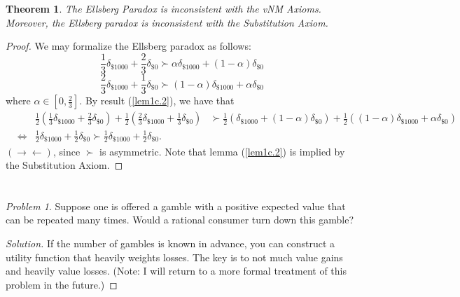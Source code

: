 \documentclass[12pt]{article}
\newtheorem{thm}{Theorem}[section]
\theoremstyle{definition}
\theoremstyle{remark}
\newtheorem{prob}{Problem}[section]
\def\contra{\rightarrow \leftarrow}
\begin{document}
\section{}
\begin{thm}
  The Ellsberg Paradox is inconsistent with the vNM Axioms. Moreover, the Ellsberg paradox is inconsistent with the Substitution Axiom.
\end{thm}
\begin{proof}
  We may formalize the Ellsberg paradox as follows:
  $$\frac{1}{3}\delta_{\$1000} + \frac{2}{3}\delta_{\$0} \succ \alpha \delta_{\$1000} + (1 - \alpha)\delta_{\$0}$$
  $$\frac{2}{3}\delta_{\$1000} + \frac{1}{3}\delta_{\$0} \succ (1 - \alpha) \delta_{\$1000} + \alpha\delta_{\$0}$$
  where $\alpha \in [0, \frac{2}{3}]$.
  By result (\ref{lem1c.2}), we have that
  \begin{align*}
  &&  \frac{1}{2}(\frac{1}{3}\delta_{\$1000} + \frac{2}{3}\delta_{\$0}) + \frac{1}{2}(\frac{2}{3}\delta_{\$1000} + \frac{1}{3}\delta_{\$0}) &\succ \frac{1}{2}(\delta_{\$1000} + (1 - \alpha)\delta_{\$0}) + \frac{1}{2}((1 - \alpha) \delta_{\$1000} + \alpha\delta_{\$0}) \\
  & \iff & \frac{1}{2}\delta_{\$1000} + \frac{1}{2}\delta_{\$0} \succ \frac{1}{2} \delta_{\$1000} + \frac{1}{2}\delta_{\$0}.
  \end{align*}
  $(\contra)$, since $\succ$ is asymmetric. Note that lemma (\ref{lem1c.2}) is implied by the Substitution Axiom.
\end{proof}
%
%
\section{}
\begin{prob}
  Suppose one is offered a gamble with a positive expected value that can be repeated many times. Would a rational consumer turn down this gamble?
\end{prob}
\begin{proof}[Solution]
  If the number of gambles is known in advance, you can construct a utility function that heavily weights losses. The key is to not much value gains and heavily value losses. (Note: I will return to a more formal treatment of this problem in the future.)
\end{proof}
\end{document}
